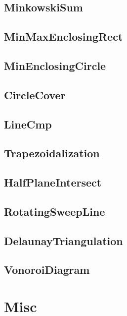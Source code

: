 	\subsection{MinkowskiSum}
	
	\subsection{MinMaxEnclosingRect}
	
	\subsection{MinEnclosingCircle}
	
	\subsection{CircleCover}
	
	\subsection{LineCmp}
	
	\subsection{Trapezoidalization}
	
	\subsection{HalfPlaneIntersect}
	
	\subsection{RotatingSweepLine}
	
	\subsection{DelaunayTriangulation}
	
	\subsection{VonoroiDiagram}
	
\section{Misc}
